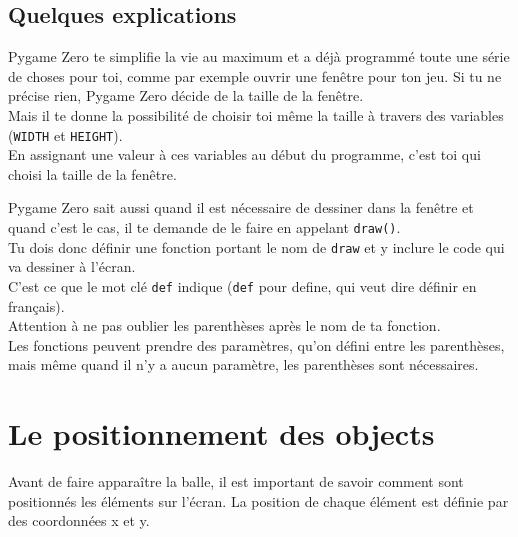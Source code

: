 \documentclass[11pt]{article}
\begin{document}
\subsection*{Quelques explications}

Pygame Zero te simplifie la vie au maximum et a déjà programmé toute une série de choses pour toi, comme par exemple ouvrir une fenêtre pour ton jeu. Si tu ne précise rien, Pygame Zero décide de la taille de la fenêtre.\\
Mais il te donne la possibilité de choisir toi même la taille à travers des variables (\lstinline{WIDTH} et \lstinline{HEIGHT}).\\
En assignant une valeur à ces variables au début du programme, c'est toi qui choisi la taille de la fenêtre.

Pygame Zero sait aussi quand il est nécessaire de dessiner dans la fenêtre et quand c'est le cas, il te demande de le faire en appelant \lstinline{draw()}.\\
Tu dois donc définir une fonction portant le nom de \lstinline{draw} et y inclure le code qui va dessiner à l'écran.\\
C'est ce que le mot clé \lstinline{def} indique (\lstinline{def} pour define, qui veut dire définir en français).\\
Attention à ne pas oublier les parenthèses après le nom de ta fonction.\\
Les fonctions peuvent prendre des paramètres, qu'on défini entre les parenthèses, mais même quand il n'y a aucun paramètre, les parenthèses sont nécessaires.
\\

\section{Le positionnement des objects}

Avant de faire apparaître la balle, il est important de savoir comment
sont positionnés les éléments sur l'écran.
La position de chaque élément est définie par des coordonnées x et y.
\end{document}
